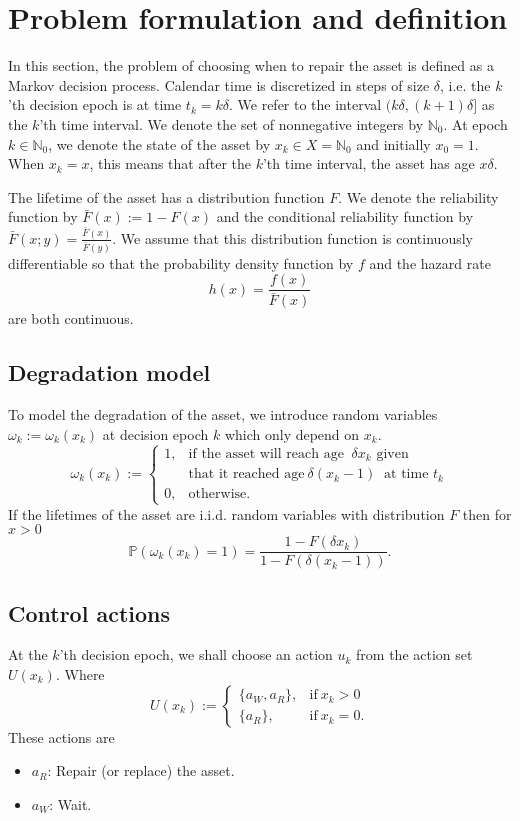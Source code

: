 \section{Problem formulation and definition}\label{section:AgeBasedDefinition}
In this section, the problem of choosing when to repair the asset is defined as a Markov decision process.
Calendar time is discretized in steps of size $\delta$, i.e. the $k$'th decision epoch is at time $t_k=k\delta$.
We refer to the interval $(k\delta,(k+1)\delta]$ as the $k$'th time interval.
We denote the set of nonnegative integers by $\mathbb{N}_0$.
At epoch $k\in\mathbb{N}_0$, we denote the state of the asset by $x_k\in X=\mathbb{N}_0$ and initially $x_0=1$.
When $x_k=x$, this means that after the $k$'th time interval, the asset has age $x\delta$.

The lifetime of the asset has a distribution function $F$.
We denote the reliability function by $\bar F(x):=1-F(x)$ and the conditional reliability function by $\bar F(x;y)=\frac{\bar F(x)}{\bar F(y)}$.
We assume that this distribution function is continuously differentiable so that the probability density function by $f$ and the hazard rate 
\[
h(x)=\frac{f(x)}{\bar F(x)}
\] 
are both continuous.

\subsection{Degradation model}
To model the degradation of the asset, we introduce random variables $\omega_k:=\omega_k(x_k)$ at decision epoch $k$ which only depend on $x_k$.
$$
\omega_k(x_k):=\begin{cases}
1,&\text{if the asset will reach age }\ \delta x_{k}\text{ given}\\
&\text{that it reached age}\ \delta(x_k-1)\ \text{ at time } t_k \\
0,&\text{otherwise}.
\end{cases}
$$
If the lifetimes of the asset are i.i.d. random variables with distribution $F$ then for $x>0$
$$
\mathbb{P}(\omega_k(x_k)=1)=\frac{1-F(\delta x_k)}{1-F(\delta (x_k-1))}.
$$

\subsection{Control actions}
At the $k$'th decision epoch, we shall choose an action $u_k$ from the action set $U(x_k)$.
Where
$$
U(x_k):=\begin{cases}
\{a_W,a_R\},&\text{if}\ x_k>0 \\
\{a_R\},&\text{if}\ x_k=0.
\end{cases}
$$
These actions are
\begin{itemize}
	\item $a_R$:
	Repair (or replace) the asset.
	\item $a_W$:
	Wait.
\end{itemize}

